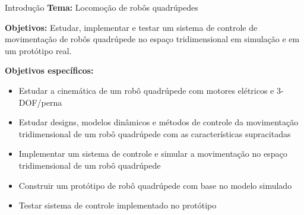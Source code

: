 \begin{frame}[t]{Introdução}
    \textbf{Tema:} Locomoção de robôs quadrúpedes

    \textbf{Objetivos:} Estudar, implementar e testar um sistema de controle de movimentação de
    robôs quadrúpede no espaço tridimensional em simulação e em um protótipo real.
    
    \textbf{Objetivos específicos:}
    \begin{itemize}
        \item Estudar a cinemática de um robô quadrúpede com motores elétricos e 3-DOF/perna
        \item Estudar designs, modelos dinâmicos e métodos de controle da movimentação
        tridimensional de um robô quadrúpede com as características supracitadas
        \item Implementar um sistema de controle e simular a movimentação no espaço
        tridimensional de um robô quadrúpede
        \item Construir um protótipo de robô quadrúpede com base no modelo simulado
        \item Testar sistema de controle implementado no protótipo
        
    \end{itemize}
\end{frame}
